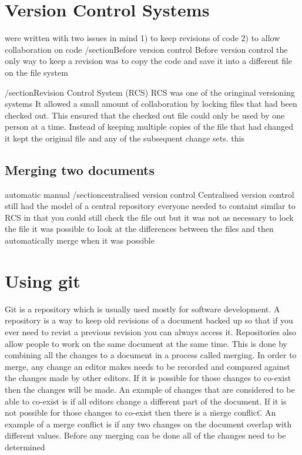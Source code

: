 \chapter{Version Control Systems}




were written with two issues in mind
1) to keep revisions of code
2) to allow collaboration on code
/section{Before version control}
Before version control the only way to keep a revision was to copy the code and save it into a different file on the file system

/section{Revision Control System (RCS)}
RCS was one of the oringinal versioning systems 
It allowed a small amount of collaboration by locking files that had been checked out.
This ensured that the checked out file could only be used by one person at a time.
Instead of keeping multiple copies of the file that had changed it kept the original file and any of the subsequent change sets.
this 
\section{Merging two documents}
automatic manual
/section{centralised version control}
Centralised version control
still had the model of a central repository everyone needed to containt
similar to RCS in that you could still check the file out but it was not as necessary to lock the file
it was possible to look at the differences between the files and then automatically merge when it was possible
\chapter{Using git}
Git is a repository which is usually used mostly for software development.
A repository is a way to keep old revisions of a document backed up so that if you ever need to revist a previous revision you can always access it.
Repositories also allow people to work on the same document at the same time.
This is done by combining all the changes to a document in a process called merging. 
In order to merge, any change an editor makes needs to be recorded and compared against the changes made by other editors.
If it is possible for those changes to co-exist then the changes will be made.
An example of changes that are considered to be able to co-exist is if all editors change a different part of the document.
If it is not possible for those changes to co-exist then there is a \"merge conflict\".
An example of a merge conflict is if any two changes on the document overlap with different values.
Before any merging can be done all of the changes need to be determined
 
 


